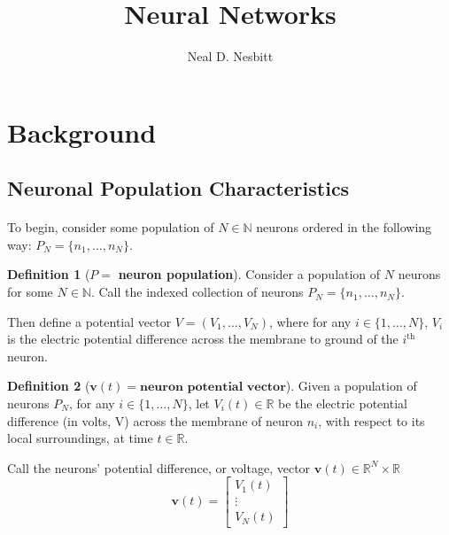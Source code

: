 \documentclass{article}
\title{Neural Networks}
\author{Neal D. Nesbitt}
\begin{document}
\maketitle

\theoremstyle{definition}
\newtheorem{definition}{Definition}[section]
\newtheorem{lemma}{Lemma}[section]


\section{Background}

\subsection{Neuronal Population Characteristics}

\paragraph{}
To begin, consider some population of $N\in\mathbb{N}$ neurons ordered in the following way: $P_{N} = \{ n_{1}, \dots, n_{N} \}$.
\begin{definition}[$P =$ \textbf{neuron population}]\label{P}
Consider a population of $N$ neurons for some $N\in\mathbb{N}$. Call the indexed collection of neurons $P_{N} = \{ n_{1}, \dots, n_{N} \}$.
\end{definition}

Then define a potential vector $V = ( V_{1}, \dots, V_{N} )$, where for any $i \in \{ 1, \dots, N \}$, $V_{i}$ is the electric potential difference across the membrane to ground of the $i^{\text{th}}$ neuron.

\begin{definition}[$\mathbf{v}(t) = \textbf{neuron potential vector}$]\label{v}
Given a population of neurons $P_{N}$, for any $i \in \{ 1, \dots, N \}$, let $V_{i}(t)\in\mathbb{R}$ be the electric potential difference (in volts, V) across the membrane of neuron $n_{i}$, with respect to its local surroundings, at time $t\in\mathbb{R}$.

Call the neurons' potential difference, or voltage, vector $\mathbf{v}(t)\in\mathbb{R}^{N}\times\mathbb{R}$
\[ \mathbf{v}(t) =
\begin{bmatrix}
V_{1}(t) \\
\vdots \\
V_{N}(t)
\end{bmatrix} \]
\end{definition}
\end{document}
